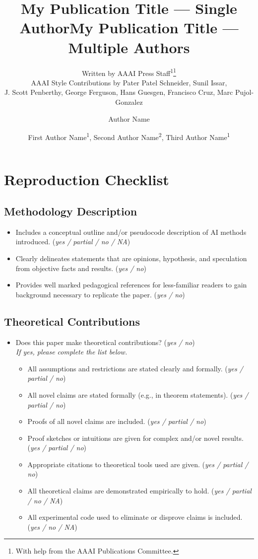 \documentclass[letterpaper]{article} %
\author{
    Written by AAAI Press Staff\textsuperscript{\rm 1}\thanks{With help from the AAAI Publications Committee.}\\
    AAAI Style Contributions by Pater Patel Schneider,
    Sunil Issar,\\
    J. Scott Penberthy,
    George Ferguson,
    Hans Guesgen,
    Francisco Cruz\equalcontrib,
    Marc Pujol-Gonzalez\equalcontrib
}
\title{My Publication Title --- Single Author}
\author {
    Author Name
}
\title{My Publication Title --- Multiple Authors}
\author {
    First Author Name\textsuperscript{\rm 1},
    Second Author Name\textsuperscript{\rm 2},
    Third Author Name\textsuperscript{\rm 1}
}
\begin{document}
\section*{Reproduction Checklist}
\subsection*{Methodology Description}
\begin{itemize}
    \item Includes a conceptual outline and/or pseudocode description of AI methods introduced. \hfill (\textit{yes / partial / no / NA})
    \item Clearly delineates statements that are opinions, hypothesis, and speculation from objective facts and results. \hfill (\textit{yes / no})
    \item Provides well marked pedagogical references for less-familiar readers to gain background necessary to replicate the paper. \hfill (\textit{yes / no})
\end{itemize}

\subsection*{Theoretical Contributions}
\begin{itemize}
    \item Does this paper make theoretical contributions? \hfill (\textit{yes / no}) \\
    \textit{If yes, please complete the list below.}
    \begin{itemize}
        \item All assumptions and restrictions are stated clearly and formally. \hfill (\textit{yes / partial / no})
        \item All novel claims are stated formally (e.g., in theorem statements). \hfill (\textit{yes / partial / no})
        \item Proofs of all novel claims are included. \hfill (\textit{yes / partial / no})
        \item Proof sketches or intuitions are given for complex and/or novel results. \hfill (\textit{yes / partial / no})
        \item Appropriate citations to theoretical tools used are given. \hfill (\textit{yes / partial / no})
        \item All theoretical claims are demonstrated empirically to hold. \hfill (\textit{yes / partial / no / NA})
        \item All experimental code used to eliminate or disprove claims is included. \hfill (\textit{yes / no / NA})
    \end{itemize}
\end{itemize}
\end{document}
